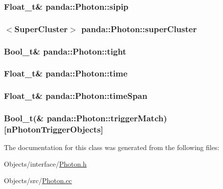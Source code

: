 \label{classpanda_1_1Photon_aec8fd29f109fca5af35837636adabad1}
\hypertarget{classpanda_1_1Photon_aa8ef9d3d55d9faf08dcdb3f12becb9fb}{
\subsubsection[{sipip}]{\setlength{\rightskip}{0pt plus 5cm}Float\_\-t\& {\bf panda::Photon::sipip}}}
\label{classpanda_1_1Photon_aa8ef9d3d55d9faf08dcdb3f12becb9fb}
\hypertarget{classpanda_1_1Photon_aec288384ab3d0be59dd5fc66785d5ea7}{
\subsubsection[{superCluster}]{$<${\bf SuperCluster}$>$ {\bf panda::Photon::superCluster}}}
\label{classpanda_1_1Photon_aec288384ab3d0be59dd5fc66785d5ea7}
\hypertarget{classpanda_1_1Photon_a44a4110d57eddc5e32a839f12978c678}{
\subsubsection[{tight}]{\setlength{\rightskip}{0pt plus 5cm}Bool\_\-t\& {\bf panda::Photon::tight}}}
\label{classpanda_1_1Photon_a44a4110d57eddc5e32a839f12978c678}
\hypertarget{classpanda_1_1Photon_a5d53d40926a8f262d6fd75dd430acb34}{
\subsubsection[{time}]{\setlength{\rightskip}{0pt plus 5cm}Float\_\-t\& {\bf panda::Photon::time}}}
\label{classpanda_1_1Photon_a5d53d40926a8f262d6fd75dd430acb34}
\hypertarget{classpanda_1_1Photon_aa053c776f39fbca09098faa9e351d395}{
\subsubsection[{timeSpan}]{\setlength{\rightskip}{0pt plus 5cm}Float\_\-t\& {\bf panda::Photon::timeSpan}}}
\label{classpanda_1_1Photon_aa053c776f39fbca09098faa9e351d395}
\hypertarget{classpanda_1_1Photon_a94008b3704aec12ec0639ec48741a624}{
\subsubsection[{triggerMatch}]{\setlength{\rightskip}{0pt plus 5cm}Bool\_\-t(\& {\bf panda::Photon::triggerMatch})\mbox{[}nPhotonTriggerObjects\mbox{]}}}
\label{classpanda_1_1Photon_a94008b3704aec12ec0639ec48741a624}


The documentation for this class was generated from the following files:\begin{DoxyCompactItemize}
\item 
Objects/interface/\hyperlink{Photon_8h}{Photon.h}\item 
Objects/src/\hyperlink{Photon_8cc}{Photon.cc}\end{DoxyCompactItemize}
